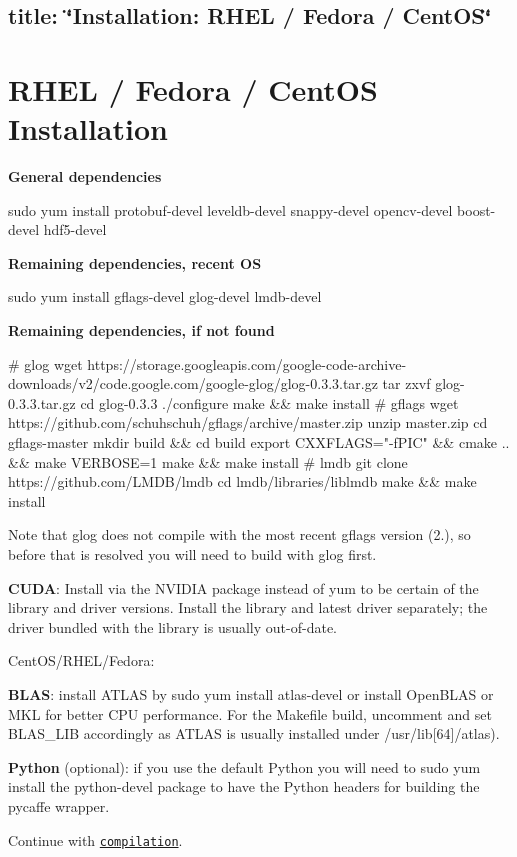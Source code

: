 

 \subsection*{title\+: \char`\"{}\+Installation\+: R\+H\+E\+L / Fedora / Cent\+O\+S\char`\"{} }

\section*{R\+H\+EL / Fedora / Cent\+OS Installation}

{\bfseries General dependencies} \begin{DoxyVerb}sudo yum install protobuf-devel leveldb-devel snappy-devel opencv-devel boost-devel hdf5-devel
\end{DoxyVerb}


{\bfseries Remaining dependencies, recent OS} \begin{DoxyVerb}sudo yum install gflags-devel glog-devel lmdb-devel
\end{DoxyVerb}


{\bfseries Remaining dependencies, if not found} \begin{DoxyVerb}# glog
wget https://storage.googleapis.com/google-code-archive-downloads/v2/code.google.com/google-glog/glog-0.3.3.tar.gz
tar zxvf glog-0.3.3.tar.gz
cd glog-0.3.3
./configure
make && make install
# gflags
wget https://github.com/schuhschuh/gflags/archive/master.zip
unzip master.zip
cd gflags-master
mkdir build && cd build
export CXXFLAGS="-fPIC" && cmake .. && make VERBOSE=1
make && make install
# lmdb
git clone https://github.com/LMDB/lmdb
cd lmdb/libraries/liblmdb
make && make install
\end{DoxyVerb}


Note that glog does not compile with the most recent gflags version (2.), so before that is resolved you will need to build with glog first.

{\bfseries C\+U\+DA}\+: Install via the N\+V\+I\+D\+IA package instead of {\ttfamily yum} to be certain of the library and driver versions. Install the library and latest driver separately; the driver bundled with the library is usually out-\/of-\/date.
\begin{DoxyItemize}
\item Cent\+O\+S/\+R\+H\+E\+L/\+Fedora\+:
\end{DoxyItemize}

{\bfseries B\+L\+AS}\+: install A\+T\+L\+AS by {\ttfamily sudo yum install atlas-\/devel} or install Open\+B\+L\+AS or M\+KL for better C\+PU performance. For the Makefile build, uncomment and set {\ttfamily B\+L\+A\+S\+\_\+\+L\+IB} accordingly as A\+T\+L\+AS is usually installed under {\ttfamily /usr/lib\mbox{[}64\mbox{]}/atlas}).

{\bfseries Python} (optional)\+: if you use the default Python you will need to {\ttfamily sudo yum install} the {\ttfamily python-\/devel} package to have the Python headers for building the pycaffe wrapper.

Continue with \href{installation.html#compilation}{\tt compilation}. 